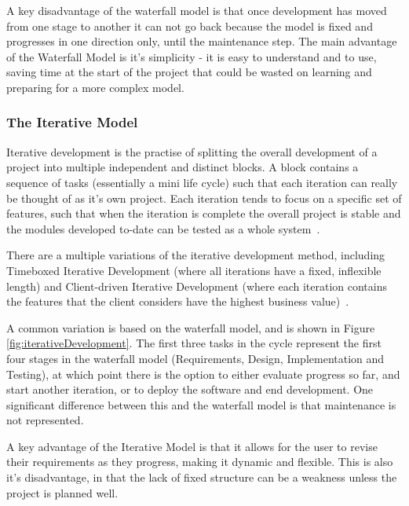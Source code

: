 \documentclass{article}
\begin{document}
A key disadvantage of the waterfall model is that once development has moved from one stage to another it can not go back because the model is fixed and progresses in one direction only, until the maintenance step.  The main advantage of the Waterfall Model is it's simplicity - it is easy to understand and to use, saving time at the start of the project that could be wasted on learning and preparing for a more complex model.

\subsubsection{The Iterative Model}
Iterative development is the practise of splitting the overall development of a project into multiple independent and distinct blocks.  A block contains a sequence of tasks (essentially a mini life cycle) such that each iteration can really be thought of as it's own project.  Each iteration tends to focus on a specific set of features, such that when the iteration is complete the overall project is stable and the modules developed to-date can be tested as a whole system~\cite{differenceBetweenLifeCycleModels}.

There are a multiple variations of the iterative development method, including Timeboxed Iterative Development (where all iterations have a fixed, inflexible length) and Client-driven Iterative Development (where each iteration contains the features that the client considers have the highest business value)~\cite{larman2004agile}.

A common variation is based on the waterfall model, and is shown in Figure \ref{fig:iterativeDevelopment}.  The first three tasks in the cycle represent the first four stages in the waterfall model (Requirements, Design, Implementation and Testing), at which point there is the option to either evaluate progress so far, and start another iteration, or to deploy the software and end development.  One significant difference between this and the waterfall model is that maintenance is not represented.

A key advantage of the Iterative Model is that it allows for the user to revise their requirements as they progress, making it dynamic and flexible.  This is also it's disadvantage, in that the lack of fixed structure can be a weakness unless the project is planned well.
\end{document}
